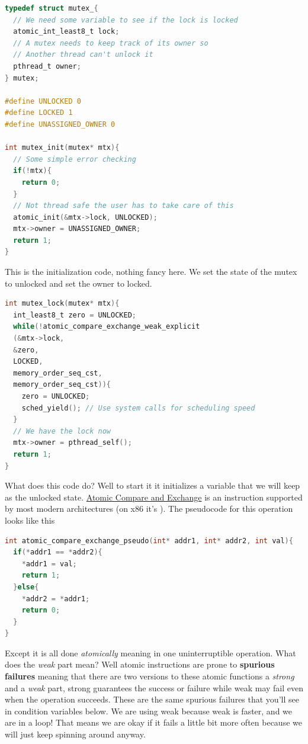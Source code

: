\begin{lstlisting}[language=C]
typedef struct mutex_{
  // We need some variable to see if the lock is locked
  atomic_int_least8_t lock;
  // A mutex needs to keep track of its owner so
  // Another thread can't unlock it
  pthread_t owner;
} mutex;

#define UNLOCKED 0
#define LOCKED 1
#define UNASSIGNED_OWNER 0

int mutex_init(mutex* mtx){
  // Some simple error checking
  if(!mtx){
    return 0;
  }
  // Not thread safe the user has to take care of this
  atomic_init(&mtx->lock, UNLOCKED);
  mtx->owner = UNASSIGNED_OWNER;
  return 1;
}
\end{lstlisting}

This is the initialization code, nothing fancy here.
We set the state of the mutex to unlocked and set the owner to locked.

\begin{lstlisting}[language=C]
int mutex_lock(mutex* mtx){
  int_least8_t zero = UNLOCKED;
  while(!atomic_compare_exchange_weak_explicit
  (&mtx->lock,
  &zero,
  LOCKED,
  memory_order_seq_cst,
  memory_order_seq_cst)){
    zero = UNLOCKED;
    sched_yield(); // Use system calls for scheduling speed
  }
  // We have the lock now
  mtx->owner = pthread_self();
  return 1;
}
\end{lstlisting}

What does this code do?
Well to start it it initializes a variable that we will keep as the unlocked state.
\href{https://en.wikipedia.org/wiki/Compare-and-swap}{Atomic Compare and Exchange} is an instruction supported by most modern architectures (on x86 it's ).
The pseudocode for this operation looks like this

\begin{lstlisting}[language=C]
int atomic_compare_exchange_pseudo(int* addr1, int* addr2, int val){
  if(*addr1 == *addr2){
    *addr1 = val;
    return 1;
  }else{
    *addr2 = *addr1;
    return 0;
  }
}
\end{lstlisting}

Except it is all done \emph{atomically} meaning in one uninterruptible operation.
What does the \emph{weak} part mean?
Well atomic instructions are prone to \textbf{spurious failures} meaning that there are two versions to these atomic functions a \emph{strong} and a \emph{weak} part, strong guarantees the success or failure while weak may fail even when the operation succeeds.
These are the same spurious failures that you'll see in condition variables below.
We are using weak because weak is faster, and we are in a loop!
That means we are okay if it fails a little bit more often because we will just keep spinning around anyway.

